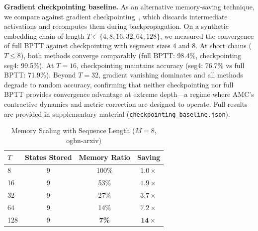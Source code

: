 \documentclass[a4paper,fleqn]{cas-dc}
\begin{document}
\textbf{Gradient checkpointing baseline.} As an alternative memory-saving technique, we compare against gradient checkpointing~\citep{Chen16Checkpoint}, which discards intermediate activations and recomputes them during backpropagation. On a synthetic embedding chain of length $T \in \{4,8,16,32,64,128\}$, we measured the convergence of full BPTT against checkpointing with segment sizes 4 and 8. At short chains ($T \leq 8$), both methods converge comparably (full BPTT: 98.4\%, checkpointing seg4: 99.5\%). At $T = 16$, checkpointing maintains accuracy (seg4: 76.7\% vs full BPTT: 71.9\%). Beyond $T = 32$, gradient vanishing dominates and all methods degrade to random accuracy, confirming that neither checkpointing nor full BPTT provides convergence advantage at extreme depth---a regime where AMC's contractive dynamics and metric correction are designed to operate. Full results are provided in supplementary material (\texttt{checkpointing\_baseline.json}).

\begin{table}[htbp]
\caption{Memory Scaling with Sequence Length ($M{=}8$, ogbn-arxiv)}
\label{tab:scaling}
\centering\footnotesize
\begin{tabular}{@{}lccc@{}}
\toprule
$T$ & States Stored & Memory Ratio & Saving \\
\midrule
8  & 9  & 100\% & $1.0\times$ \\
16 & 9  & 53\%  & $1.9\times$ \\
32 & 9  & 27\%  & $3.7\times$ \\
64 & 9  & 14\%  & $7.2\times$ \\
128& 9  & \textbf{7\%} & $\mathbf{14\times}$ \\
\bottomrule
\end{tabular}
\end{table}
\end{document}
